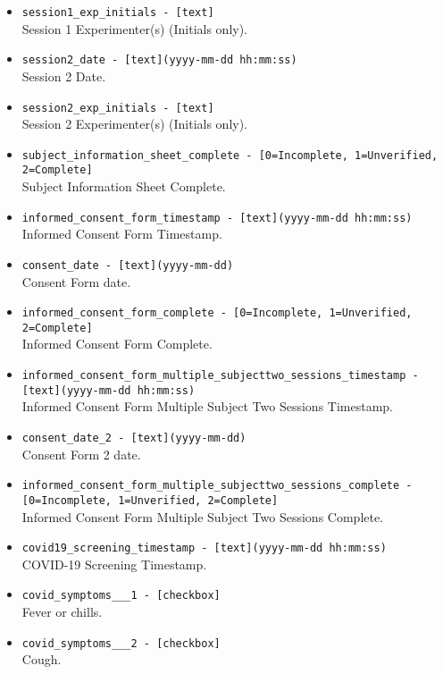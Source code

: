 \begin{description}
\begin{addmargin}[0em]{0em}
\begin{addmargin}[1em]{0em}
\begin{itemize}
            \item \verb|session1_exp_initials - [text]|\\Session 1 Experimenter(s) (Initials only).
            \item \verb|session2_date - [text](yyyy-mm-dd hh:mm:ss)|\\Session 2 Date.
            \item \verb|session2_exp_initials - [text]|\\Session 2 Experimenter(s) (Initials only).
            \item \verb|subject_information_sheet_complete - [0=Incomplete, 1=Unverified, 2=Complete]|\\Subject Information Sheet Complete.
            \item \verb|informed_consent_form_timestamp - [text](yyyy-mm-dd hh:mm:ss)|\\Informed Consent Form Timestamp.
            \item \verb|consent_date - [text](yyyy-mm-dd)|\\Consent Form date.
            \item \verb|informed_consent_form_complete - [0=Incomplete, 1=Unverified, 2=Complete]|\\Informed Consent Form Complete.
            \item \verb|informed_consent_form_multiple_subjecttwo_sessions_timestamp -|\\\verb|[text](yyyy-mm-dd hh:mm:ss)|\\Informed Consent Form Multiple Subject Two Sessions Timestamp.
            \item \verb|consent_date_2 - [text](yyyy-mm-dd)|\\Consent Form 2 date.
            \item \verb|informed_consent_form_multiple_subjecttwo_sessions_complete -|\\\verb|[0=Incomplete, 1=Unverified, 2=Complete]|\\Informed Consent Form Multiple Subject Two Sessions Complete.
            \item \verb|covid19_screening_timestamp - [text](yyyy-mm-dd hh:mm:ss)|\\COVID-19 Screening Timestamp.
            \item \verb|covid_symptoms___1 - [checkbox]|\\Fever or chills.
            \item \verb|covid_symptoms___2 - [checkbox]|\\Cough.

\end{itemize}
\end{addmargin}
\end{addmargin}
\end{description}
